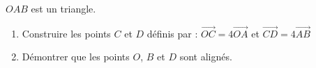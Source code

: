 
$OAB$ est un triangle.
\begin{enumerate}
\item Construire les points $C$ et $D$ définis par : $\overrightarrow{OC}=4\overrightarrow{OA}$  et $\overrightarrow{CD}=4\overrightarrow{AB}$
\item Démontrer que les points $O$, $B$ et $D$ sont alignés.
\end{enumerate}
